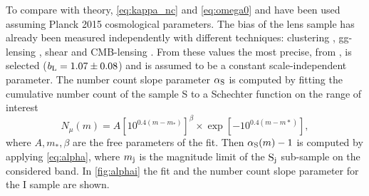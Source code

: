 To compare with theory, \autoref{eq:kappa_nc} and \autoref{eq:omega0} and  have been used assuming Planck 2015 \cite{2016A&A...594A..13P} cosmological parameters. The bias of the lens sample has already been measured independently with different techniques: clustering \cite{2016MNRAS.455.4301C}, gg-lensing \cite{2016arXiv160908167P}, shear \cite{2016MNRAS.459.3203C} and CMB-lensing \cite{2016MNRAS.456.3213G}. From these values the most precise, from \cite{2016MNRAS.455.4301C}, is selected ($b_{\rm L}=1.07\pm0.08$) and is assumed to be a constant scale-independent parameter. The number count slope parameter $\alpha_{\rm S}$ is computed by fitting the cumulative number count of the sample S to a Schechter function \cite{1976ApJ...203..297S} on the range of interest
\begin{equation}
N_\mu(m) = A\left[10^{0.4(m-m_*)}\right]^\beta\times\exp\left[-10^{0.4(m-m*)}\right],
\label{eq:sch}
\end{equation}
where $A,m_*,\beta$ are the free parameters of the fit. Then $\alpha_{\rm S}(m)-1$ is computed by applying \autoref{eq:alpha}, where $m_{\rm j}$ is the magnitude limit of the $\rm S_j$ sub-sample on the considered band. In \autoref{fig:alphai} the fit and the number count slope parameter for the I sample are shown.
